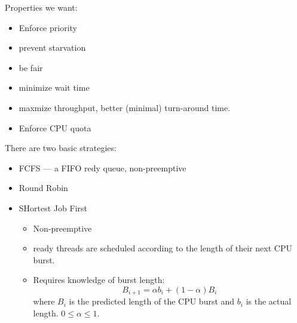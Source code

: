 \documentclass[12pt]{article}
\begin{document}
Properties we want:
\begin{itemize}
	\item Enforce priority
	\item prevent starvation
	\item be fair
	\item minimize wait time
	\item maxmize throughput, better (minimal) turn-around time.
	\item Enforce CPU quota
\end{itemize}

There are two basic strategies:
\begin{itemize}
	\item FCFS --- a FIFO redy queue, non-preemptive
	\item Round Robin
	\item SHortest Job First
		\begin{itemize}
			\item Non-preemptive
			\item ready threads are scheduled according to the length of their
				next CPU burst.
			\item Requires knowledge of burst length:
				\[B_{i+1} = \alpha b_i + (1-\alpha)B_i\]
				where $B_i$ is the predicted length of the CPU burst and
				$b_i$ is the actual length. $0 \le \alpha \le 1$.
		\end{itemize}
\end{itemize}
\end{document}
